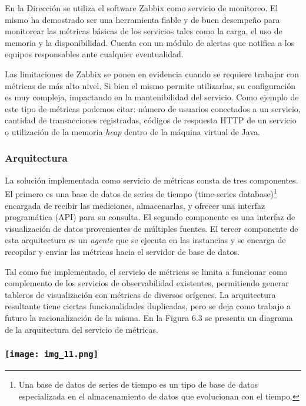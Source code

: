 En la Dirección se utiliza el software Zabbix como servicio de monitoreo. El mismo ha demostrado ser una herramienta fiable y de buen desempeño para monitorear las métricas básicas de los servicios tales como la carga, el uso de memoria y la disponibilidad. Cuenta con un módulo de alertas que notifica a los equipos responsables ante cualquier eventualidad.

Las limitaciones de Zabbix se ponen en evidencia cuando se requiere trabajar con métricas de más alto nivel. Si bien el mismo permite utilizarlas, su configuración es muy compleja, impactando en la mantenibilidad del servicio. Como ejemplo de este tipo de métricas podemos citar: número de usuarios conectados a un servicio, cantidad de transacciones registradas, códigos de respuesta HTTP de un servicio o utilización de la memoria \textit{heap} dentro de la máquina virtual de Java.

\subsubsection{Arquitectura}

La solución implementada como servicio de métricas consta de tres componentes. El primero es una base de datos de series de tiempo (time-series database)\footnote{ Una base de datos de series de tiempo es un tipo de base de datos especializada en el almacenamiento de datos que evolucionan con el tiempo. } encargada de recibir las mediciones, almacenarlas, y ofrecer una interfaz programática (API) para su consulta. El segundo componente es una interfaz de visualización de datos provenientes de múltiples fuentes. El tercer componente de esta arquitectura es un \textit{agente} que se ejecuta en las instancias y se encarga de recopilar y enviar las métricas hacia el servidor de base de datos. 

Tal como fue implementado, el servicio de métricas se limita a funcionar como complemento de los servicios de observabilidad existentes, permitiendo generar tableros de visualización con métricas de diversos orígenes. La arquitectura resultante tiene ciertas funcionalidades duplicadas, pero se deja como trabajo a futuro la racionalización de la misma. En la Figura 6.3 se presenta un diagrama de la arquitectura del servicio de métricas.

\subsubsection{\texttt{[image: img\_11.png]}
}

